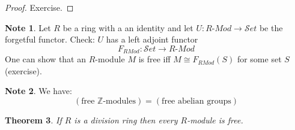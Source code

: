 \documentclass[12pt, letterpaper, oneside]{article}
\theoremstyle{plain}
\newtheorem{theorem}{Theorem}[section]
\theoremstyle{definition}
\newtheorem{note}[theorem]{Note}
\newcommand{\Z}{{\mathbb Z}}
\newcommand{\Set}{{\mathcal Set}}
\newcommand{\vs}{\vskip 5mm}
\begin{document}
 
 \begin{proof}
 Exercise. 
 \end{proof}
 
 
 
 \vs\vs
 
 
 \begin{note}
 Let $R$ be a ring with a an identity and let $U\colon R\text{-}Mod \to \Set$ be the forgetful functor. 
 Check: $U$ has a left adjoint functor 
 $$F_{RMod}\colon \Set \to  R\text{-}Mod$$
One can show that  an $R$-module $M$ is free iff $M\cong F_{RMod}(S)$ for some set $S$
(exercise).
 \end{note}
 
 
 \vs\vs
 

 
 
 \begin{note} We have:
 $$(\text{free $\Z$-modules}) = (\text{free abelian groups})$$
 \end{note}
 
 
 \vs\vs
 
 
 \begin{theorem}
 \label{THM_DIVRINGFREEMODS}
 If $R$ is a division ring then every $R$-module is free. 
 \end{theorem}
 
 \vs
 
\end{document}
